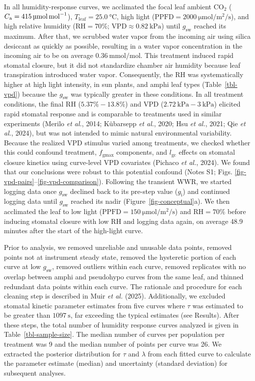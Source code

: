 \documentclass[
  letterpaper,
  DIV=11,
  numbers=noendperiod]{scrartcl}
\newcommand{\caequals}[1]{$C_\mathrm{a} = \SI{#1}{\micro\mol\raiseto{-1}\mol}$}
\newcommand{\fgmax}{$f_\mathrm{gmax}$}
\newcommand{\gcl}{$l_\mathrm{gc}$}
\newcommand{\gi}{$g_\mathrm{i}$}
\newcommand{\gsw}{$g_\mathrm{sw}$}
\newcommand{\ppfdequals}[1]{$\mathrm{PPFD} = \SI{#1}{\micro\mole\per\meter\squared\per\second}$}
\newcommand{\rh}{$\mathrm{RH}$}
\newcommand{\rhequals}[1]{$\mathrm{RH} = #1\%$}
\newcommand{\tleafequals}[1]{$T_\mathrm{leaf} = \SI{#1}{\degreeCelsius}$}
\begin{document}
In all humidity-response curves, we acclimated the focal leaf ambient
CO\(_2\) (\caequals{415}), \tleafequals{25.0}, high light
(\ppfdequals{2000}), and high relative humidity (\rhequals{70};
\(\mathrm{VPD} \approx \SI{0.82}{\kPa}\)) until \gsw{} reached its
maximum. After that, we scrubbed water vapor from the incoming air using
silica desiccant as quickly as possible, resulting in a water vapor
concentration in the incoming air to be on average
\(\SI{0.36}{\milli\mol\per\mol}\). This treatment induced rapid stomatal
closure, but it did not standardize chamber air humidity because leaf
transpiration introduced water vapor. Consequently, the RH was
systematically higher at high light intensity, in sun plants, and amphi
leaf types (Table~\ref{tbl-vpd}) because the \gsw{} was typically
greater in these conditions. In all treatment conditions, the final RH
(\(5.37\%-13.8\%\)) and VPD (\(\SI{2.72}{\kPa} - \SI{3}{\kPa}\))
elicited rapid stomatal response and is comparable to treatments used in
similar experiments (Merilo \emph{et al.}, 2014; Kübarsepp \emph{et
al.}, 2020; Hsu \emph{et al.}, 2021; Qie \emph{et al.}, 2024), but was
not intended to mimic natural environmental variability. Because the
realized VPD stimulus varied among treatments, we checked whether this
could confound treatment, \fgmax{} components, and \gcl{} effects on
stomatal closure kinetics using curve-level VPD covariates (Pichaco
\emph{et al.}, 2024). We found that our conclusions were robust to this
potential confound (Notes S1; Figs.
\ref{fig-vpd-pairs}--\ref{fig-vpd-comparison}). Following the transient
WWR, we started logging data once \gsw{} declined back to its pre-step
value (\gi) and continued logging data until \gsw{} reached its nadir
(Figure~\ref{fig-conceptual}a). We then acclimated the leaf to low light
(\ppfdequals{150}) and \rhequals{70} before inducing stomatal closure
with low \rh{} and logging data again, on average 48.9 minutes after the
start of the high-light curve.

Prior to analysis, we removed unreliable and unusable data points,
removed points not at instrument steady state, removed the hysteretic
portion of each curve at low \gsw{}, removed outliers within each curve,
removed replicates with no overlap between amphi and pseudohypo curves
from the same leaf, and thinned redundant data points within each curve.
The rationale and procedure for each cleaning step is described in Muir
\emph{et al.} (2025). Additionally, we excluded stomatal kinetic
parameter estimates from five curves where \(\tau\) was estimated to be
greater than \(\SI{1097}{\second}\), far exceeding the typical estimates
(see Results). After these steps, the total number of humidity response
curves analyzed is given in Table~\ref{tbl-sample-size}. The median
number of curves per population per treatment was 9 and the median
number of points per curve was 26. We extracted the posterior
distribution for \(\tau\) and \(\lambda\) from each fitted curve to
calculate the parameter estimate (median) and uncertainty (standard
deviation) for subsequent analyses.
\end{document}

